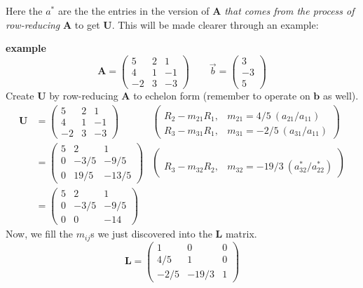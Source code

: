 \documentclass[12pt]{exam}
\newcommand{\ve}[1]{\ensuremath{\mathbf{#1}}}
\begin{document}
Here the $a^*$ are the the entries in the version of $\ve{A}$ \textit{that comes from the process of row-reducing} $\ve{A}$ to get $\ve{U}$. This will be made clearer through an example:

\textbf{example}
\begin{equation}
\ve{A} = \begin{pmatrix}
  5  & 2 & 1 \\
  4  & 1 & -1 \\
  -2 & 3 & -3
\end{pmatrix}
\qquad 
\vec{b}= \begin{pmatrix}
3 \\ -3 \\ 5
\end{pmatrix} \nonumber
\end{equation}
%
%
Create $\ve{U}$ by row-reducing $\ve{A}$ to echelon form (remember to operate on $\ve{b}$ as well). 
\begin{align}
\ve{U} &= \begin{pmatrix}
  5  & 2 & 1 \\
  4  & 1 & -1 \\
  -2 & 3 & -3
\end{pmatrix} 
&\begin{pmatrix}
 & \\ R_2 - m_{21}R_1, & m_{21} = 4/5 \:(a_{21}/a_{11})\\ 
      R_3 - m_{31}R_1, & m_{31} = -2/5 \:(a_{31}/a_{11})\end{pmatrix}  
\nonumber \\
%
&= \begin{pmatrix}
  5 & 2    & 1 \\
  0 & -3/5 & -9/5 \\
  0 & 19/5 & -13/5
\end{pmatrix} 
&\begin{pmatrix}
 & \\ & \\ R_3 - m_{32}R_2, & m_{32} = -19/3 \:(a^{*}_{32}/a^{*}_{22})\end{pmatrix} \nonumber \\                   
%
&= \begin{pmatrix}
  5 & 2    & 1 \\
  0 & -3/5 & -9/5 \\
  0 & 0    & -14
\end{pmatrix} 
\end{align}
%
Now, we fill the $m_{ij}$s we just discovered into the $\ve{L}$ matrix.
%
\begin{equation}
\ve{L} = \begin{pmatrix}
  1    & 0     & 0 \\
  4/5  & 1     & 0 \\
  -2/5 & -19/3 & 1
\end{pmatrix} \nonumber
\end{equation}
\end{document}
